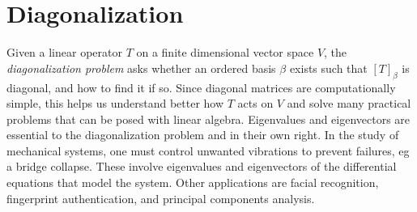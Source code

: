 \chapter{Diagonalization}
Given a linear operator $T$ on a finite dimensional vector space $V$, the \emph{diagonalization problem} asks whether an ordered basis $\beta$ exists such that $[T]_\beta$ is diagonal, and how to find it if so.
Since diagonal matrices are computationally simple, this helps us understand better how $T$ acts on $V$ and solve many practical problems that can be posed with linear algebra.
Eigenvalues and eigenvectors are essential to the diagonalization problem and in their own right.
In the study of mechanical systems, one must control unwanted vibrations to prevent failures, eg a bridge collapse. These involve eigenvalues and eigenvectors of the differential equations that model the system.
Other applications are facial recognition, fingerprint authentication, and principal components analysis.

